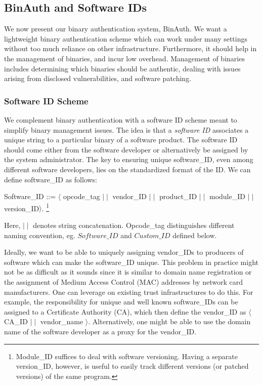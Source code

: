 \subsection{BinAuth and Software IDs}
\label{sec:binauth-scheme}

We now present our binary authentication system, BinAuth.
We want a lightweight binary authentication scheme which can work
under many settings without too much reliance on other infrastructure.
Furthermore, it should help in the management of binaries, and incur low overhead.
Management of binaries includes determining which binaries should be
authentic, dealing with issues arising from disclosed vulnerabilities,
and software patching.

\subsubsection{Software ID Scheme}


We complement binary authentication with a software ID scheme meant
to simplify binary management issues.
The idea is that a {\em software ID} associates a
unique string to a particular binary of a software product.
The software ID should come either from the software developer
or alternatively be assigned by the system administrator.
The key to ensuring unique software\_ID, even among different
software developers, lies on the standardized format of the ID.
We can define software\_ID as follows:
\begin{center}
\small
Software\_ID ::= $\langle$ opcode\_tag $\mid\mid$ vendor\_ID $\mid\mid$ 
product\_ID $\mid\mid$ module\_ID $\mid\mid$ version\_ID$\rangle$.
\footnote{Module\_ID suffices to deal with software versioning.
Having a separate version\_ID, however, is useful to easily
track different versions (or patched versions) of the same program.}
\end{center}
\noindent 
Here, $\mid\mid$ denotes string concatenation.
Opcode\_tag distinguishes different naming convention, eg.
$Software\_ID$ and $Custom\_ID$ defined below.

Ideally, we want to be able to uniquely assigning vendor\_IDs to
producers of software which can make the software\_ID unique.
This problem in practice might not be as difficult as it sounds since
it is similar to domain name registration or the assignment
of Medium Access Control (MAC) addresses by network card manufacturers.
One can leverage on existing trust infrastructures to do this.
For example, the responsibility for unique and well known software\_IDs
can be assigned to a Certificate Authority (CA), which then 
define the vendor\_ID as $\langle$ CA\_ID $\mid\mid$ vendor\_name $\rangle$. 
Alternatively, one might be able to use the domain name of the 
software developer as a proxy for the vendor\_ID.

